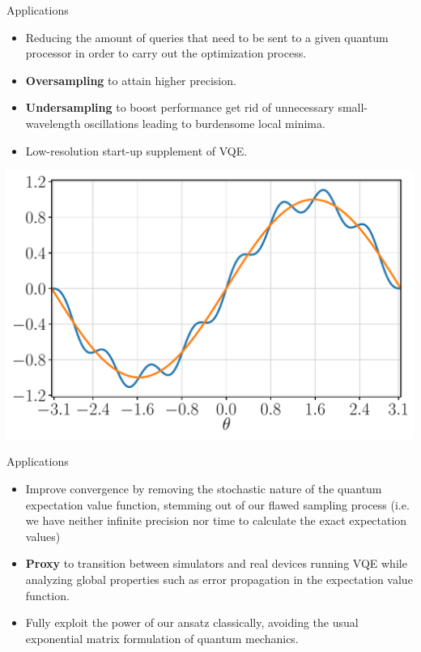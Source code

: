 \documentclass[9pt, handout, aspectratio=169]{beamer}	%
\begin{document}
\begin{frame}{Applications}

	\begin{multicols}{2}
		\begin{itemize}
			\item Reducing the amount of queries that need to be sent to a given quantum processor in order to carry out the optimization process.
			\item \textbf{Oversampling} to attain higher precision.
			\item \textbf{Undersampling} to boost performance get rid of unnecessary small-wavelength oscillations leading to burdensome local minima.
			\item Low-resolution start-up supplement of VQE.
		\end{itemize}

		\columnbreak

		\begin{center}
			\includegraphics[width=.40\paperwidth]{Figures/low-resolution}
		\end{center}

	\end{multicols}

\end{frame}


\begin{frame}{Applications}

	\begin{itemize}
		\item Improve convergence by removing the stochastic nature of the quantum expectation value function, stemming out of our flawed sampling process (i.e. we have neither infinite precision nor time to calculate the exact expectation values)
		\item \textbf{Proxy} to transition between simulators and real devices running VQE while analyzing global properties such as error propagation in the expectation value function.
		\item Fully exploit the power of our ansatz classically, avoiding the usual exponential matrix formulation of quantum mechanics.
	\end{itemize}

\end{frame}
\end{document}
